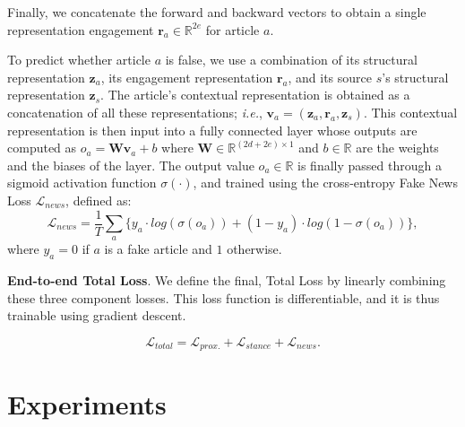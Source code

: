 \documentclass[sigconf,anonymous]{acmart}
\theoremstyle{definition}
\theoremstyle{hypothesis}
\begin{document}
Finally, we concatenate the forward and backward vectors to obtain a single representation engagement $\boldsymbol{r}_a\in\mathbb{R}^{2e}$ for article $a$.

To predict whether article $a$ is false, we use a combination of its structural representation $\boldsymbol{z}_a$, its engagement representation $\boldsymbol{r}_a$, and its source $s$'s structural representation $\boldsymbol{z}_s$. The article's contextual representation is obtained as a concatenation of all these representations; {\it i.e.}, $\boldsymbol{v}_a = (\boldsymbol{z}_a, \boldsymbol{r}_a, \boldsymbol{z}_s)$. This contextual representation is then input into a fully connected layer whose outputs are computed as $o_a = \mathbf{W}\boldsymbol{v}_a+b$ where $\boldsymbol{W}\in \mathbb{R}^{(2d+2e)\times 1}$ and $b\in \mathbb{R}$ are the weights and the biases of the layer. The output value $o_a \in \mathbb{R}$
is finally passed through a sigmoid activation function $\sigma(\cdot)$, and trained using the cross-entropy Fake News Loss $\mathcal{L}_{news}$, defined as:   
\begin{equation}
    \mathcal{L}_{news}=\frac{1}{T}\sum_a\{{y}_{a} \cdot log(\sigma({o}_{a}))+(1-{y}_{a})\cdot log(1-\sigma({o}_{a}))\}, 
\end{equation}
where $y_{a}=0$ if $a$ is a fake article and $1$ otherwise.

\textbf{End-to-end Total Loss}. We define the final, Total Loss 
by linearly combining these three component losses.  This loss function is differentiable, and it is thus trainable using gradient descent.

\begin{equation}
    \mathcal{L}_{total} = \mathcal{L}_{prox.} + \mathcal{L}_{stance} + \mathcal{L}_{news}. 
\end{equation}


\section{Experiments}

\end{document}
